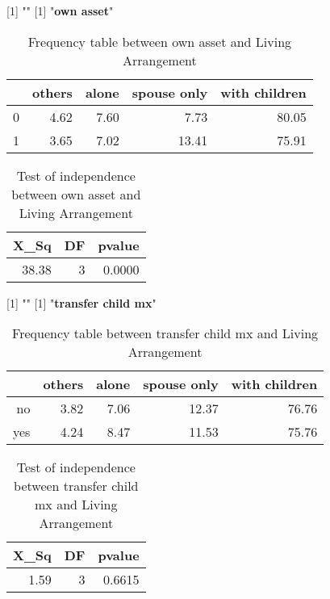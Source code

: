 \documentclass[11pt]{article}
\begin{document}
[1] "\newline"
[1] "{\bf{own asset}}"
\begin{table}[H]
\centering
\begin{tabular}{rrrrr}
  \hline
 & others & alone & spouse only & with children \\ 
  \hline
0 & 4.62 & 7.60 & 7.73 & 80.05 \\ 
  1 & 3.65 & 7.02 & 13.41 & 75.91 \\ 
   \hline
\end{tabular}
\caption{Frequency table between own asset and Living Arrangement} 
\end{table}
\begin{table}[H]
\centering
\begin{tabular}{rrr}
  \hline
X\_Sq & DF & pvalue \\ 
  \hline
38.38 & 3 & 0.0000 \\ 
   \hline
\end{tabular}
\caption{Test of independence between own asset and Living Arrangement} 
\end{table}
[1] "\newline"
[1] "{\bf{transfer child mx}}"
\begin{table}[H]
\centering
\begin{tabular}{rrrrr}
  \hline
 & others & alone & spouse only & with children \\ 
  \hline
no & 3.82 & 7.06 & 12.37 & 76.76 \\ 
  yes & 4.24 & 8.47 & 11.53 & 75.76 \\ 
   \hline
\end{tabular}
\caption{Frequency table between transfer child mx and Living Arrangement} 
\end{table}
\begin{table}[H]
\centering
\begin{tabular}{rrr}
  \hline
X\_Sq & DF & pvalue \\ 
  \hline
1.59 & 3 & 0.6615 \\ 
   \hline
\end{tabular}
\caption{Test of independence between transfer child mx and Living Arrangement} 
\end{table}
\end{document}
